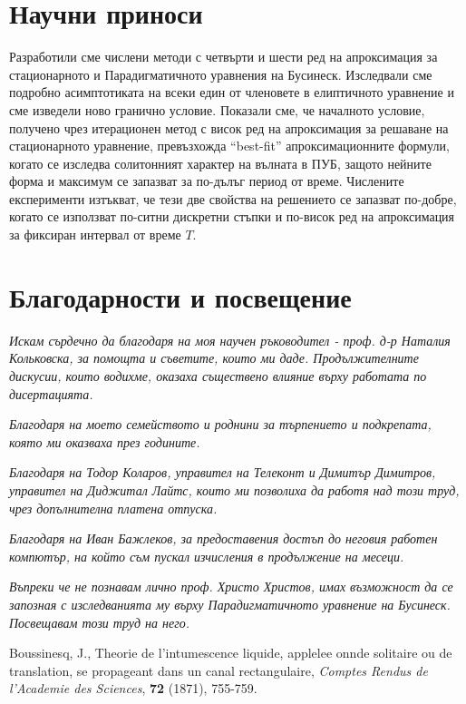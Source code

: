 \documentclass[a5paper]{article}
\theoremstyle{remark}
\begin{document}
\begin{normalsize}
\section{Научни приноси}
Разработили сме числени методи с четвърти и шести ред на апроксимация за стационарното и  Парадигматичното уравнения на Бусинеск. 
Изследвали сме подробно асимптотиката на всеки един от членовете в елиптичното уравнение и сме изведели ново гранично условие. 
Показали сме, че началното условие, получено чрез итерационен метод с висок ред на апроксимация за решаване на стационарното уравнение, превъзхожда ``best-fit'' апроксимационните формули, когато се изследва солитонният характер на вълната в ПУБ, защото нейните форма и максимум се запазват за по-дълъг период от време. 
Числените експерименти изтъкват, че тези две свойства на решението се запазват по-добре, когато се използват по-ситни дискретни стъпки и по-висок ред на апроксимация за фиксиран интервал от време $T$. 

\newpage
\section{Благодарности и посвещение}

{\large \it Искам сърдечно да благодаря на моя научен ръководител - проф. д-р Наталия Кольковска, за помощта и съветите, които ми даде. Продължителните дискусии, които водихме, оказаха съществено влияние върху работата по дисертацията.}

{\large \it Благодаря на моето семейството и роднини за търпението и подкрепата, която ми оказваха през годините.}

{\large \it Благодаря на Тодор Коларов, управител на Телеконт и Димитър Димитров, управител на Диджитал Лайтс, които ми позволиха да работя над този труд, чрез допълнителна платена отпуска.}

{\large \it Благодаря на Иван Бажлеков, за предоставения достъп до неговия работен компютър, на който съм пускал изчисления в продължение на месеци.}

\vspace{4cm}

{\large \it Въпреки че не познавам лично проф. Христо Христов, имах възможност да се запозная с  изследванията му върху Парадигматичното уравнение на Бусинеск. Посвещавам този труд на него. }

\newpage
\begin{thebibliography}{99}

	 Boussinesq, J., Theorie de l'intumescence liquide, applelee onnde solitaire ou de translation, se propageant dans un canal rectangulaire, {\it Comptes Rendus de l'Academie des Sciences}, \textbf{72} (1871), 755-759.


\end{thebibliography}
\end{normalsize}
\end{document}

